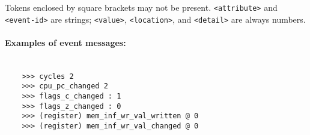             Tokens enclosed by square brackets may not be present. \texttt{<attribute>} and \texttt{<event-id>} are strings; \texttt{<value>}, \texttt{<location>}, and \texttt{<detail>} are always numbers.

        \paragraph{Examples of event messages:}~\\
            \verb'    >>> cycles 2'\\
            \verb'    >>> cpu_pc_changed 2'\\
            \verb'    >>> flags_c_changed : 1'\\
            \verb'    >>> flags_z_changed : 0'\\
            \verb'    >>> (register) mem_inf_wr_val_written @ 0'\\
            \verb'    >>> (register) mem_inf_wr_val_changed @ 0'\\

